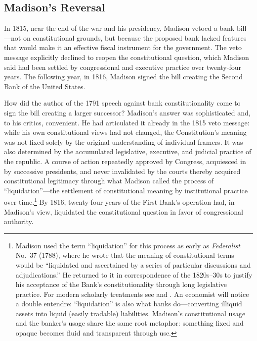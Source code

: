 \documentclass[12pt]{article}
\begin{document}
\subsection{Madison's Reversal}

In 1815, near the end of the war and his presidency, Madison vetoed a
bank bill---not on constitutional grounds, but because the proposed
bank lacked features that would make it an effective fiscal instrument
for the government.  The veto message explicitly declined to reopen the
constitutional question, which Madison said had been settled by
congressional and executive practice over twenty-four years.  The
following year, in 1816, Madison signed the bill creating the Second
Bank of the United States.

How did the author of the 1791 speech against bank constitutionality
come to sign the bill creating a larger successor?  Madison's answer
was sophisticated and, to his critics, convenient.
He had articulated it already in the 1815 veto message: while his own
constitutional views had not changed, the Constitution's meaning was
not fixed solely by the original understanding of individual framers.
It was also determined by the accumulated legislative, executive, and
judicial practice of the republic.  A course of action repeatedly
approved by Congress, acquiesced in by successive presidents, and
never invalidated by the courts thereby acquired constitutional
legitimacy through what Madison called the process of
``liquidation''---the settlement of constitutional meaning by
institutional practice over time.\footnote{Madison used the term
  ``liquidation'' for this process as early as \textit{Federalist}
  No.~37 (1788), where he wrote that the meaning of constitutional
  terms would be ``liquidated and ascertained by a series of
  particular discussions and adjudications.''  He returned to it in
  correspondence of the 1820s--30s to justify his acceptance of the
  Bank's constitutionality through long legislative practice.  For
  modern scholarly treatments see \citet{Nelson2003} and
  \citet{BaudeSachs2017}.  An economist will notice a double
  entendre: ``liquidation'' is also what banks do---converting
  illiquid assets into liquid (easily tradable) liabilities.  Madison's
  constitutional usage and the banker's usage share the same root
  metaphor: something fixed and opaque becomes fluid and
  transparent through use.}  By 1816, twenty-four years of the
First Bank's operation had, in Madison's view, liquidated the
constitutional question in favor of congressional authority.
\end{document}

